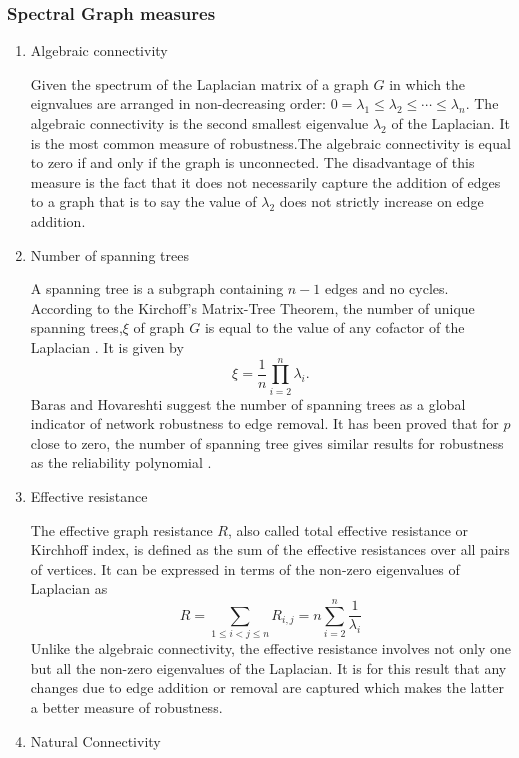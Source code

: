 \documentclass[10pt,a4paper]{article}
\begin{document}
	\subsubsection{Spectral Graph measures}
	\begin{enumerate}
		\item Algebraic connectivity
		
		Given the spectrum of the Laplacian matrix of a graph $G$ in which the eignvalues are arranged in non-decreasing order: $0=\lambda_1\leq \lambda_2 \leq \cdots \leq \lambda_n$. The algebraic connectivity is the second smallest eigenvalue $\lambda_2$ of the Laplacian. It is the most common measure of robustness.The algebraic connectivity is equal to zero if and only if the graph is unconnected. The disadvantage of this measure is the fact that it does not necessarily capture the addition of edges to a graph that is to say the value of $\lambda_2$ does not strictly increase on edge addition.
		\item Number of spanning trees
				
		A spanning tree is a subgraph containing $n-1$ edges and no cycles. According to the Kirchoff's Matrix-Tree Theorem, the number of unique spanning trees,$\xi$ of graph $G$ is equal to the value of any cofactor of the Laplacian \citep{harris2008combinatorics}. It  is given by
		\begin{equation}
		\xi = \frac{1}{n} \prod_{i=2}^{n} \lambda_i.
		\end{equation}
		Baras and Hovareshti suggest the number of spanning trees as a global indicator of network robustness to edge removal. It has been proved that for $p$ close to zero, the number of spanning tree gives similar results for robustness as the reliability polynomial \citep{baras2009efficient}.
		\item Effective resistance
		
		The effective graph resistance $R$, also called total effective resistance or Kirchhoff index, is
		defined as the sum of the effective resistances over all pairs of vertices. It can be expressed in terms of the non-zero eigenvalues of Laplacian as
		\begin{equation}
		R = \sum_{1\leq i < j \leq n} R_{i,j} = n \sum_{i=2}^{n} \frac{1}{\lambda_i}
		\end{equation}
		Unlike the algebraic connectivity, the effective resistance involves not only one but all the non-zero eigenvalues of the Laplacian. It is for this result that any changes due to edge addition or removal are captured which makes the latter a better measure of robustness.
		\item Natural Connectivity
		

\end{enumerate}
\end{document}
